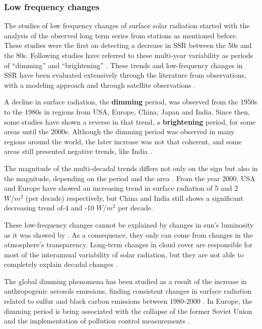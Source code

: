 \subsubsection{Low frequency changes}

The studies of low frequency changes of surface solar radiation started with the analysis of the observed long term series from stations as mentioned before. These studies were the first on detecting a decrease in SSR between the 50s and the 80s. Following studies have referred to these multi-year variability as periods of ``dimming'' and ``brightening'' \cite*{Wild2012}. These trends and low-frequency changes in SSR have been evaluated extensively through the literature from observations, with a modeling approach and through satellite observations \cite*{Wilcox2013, Wild2005, Wild2009, Sanchez-Lorenzo2009, Mateos2014, Pfeifroth2017}.

A decline in surface radiation, the \textbf{dimming} period, was observed from the 1950s to the 1980s in regions from USA, Europe, China, Japan and India. Since then, some studies have shown a reverse in that trend, a \textbf{brightening} period, for some areas until the 2000s. Although the dimming period was observed in many regions around the world, the later increase was not that coherent, and some areas still presented negative trends, like India \cite*{Wild2012}.

The magnitude of the multi-decadal trends differs not only on the sign but also in the magnitude, depending on the period and the area \cite*{Wild2009, Wild2012}. From the year 2000, USA and Europe have showed an increasing trend in surface radiation of 5 and 2 $W/m^2$ (per decade) respectively, but China and India still shows a significant decreasing trend of-4 and -10 $W/m^2$ per decade. 

These low-frequency changes cannot be explained by changes in sun's luminosity as it was showed by \cite*{Willson2003}. As a consequence, they only can come from changes in the atmosphere's transparency. Long-term changes in cloud cover are responsible for most of the interannual variability of solar radiation, but they are not able to completely explain decadal changes \cite*{Norris2007, Sanchez-Lorenzo2009}.

The global dimming phenomena has been studied as a result of the increase in anthropogenic aerosols emissions, finding consistent changes in surface radiation related to sulfur and black carbon emissions between 1980-2000 \cite*{Streets2006, Norris2007}. In Europe, the dimming period is being associated with the collapse of the former Soviet Union and the implementation of pollution control measurements \cite*{Wild2005, Wild2009}. %

